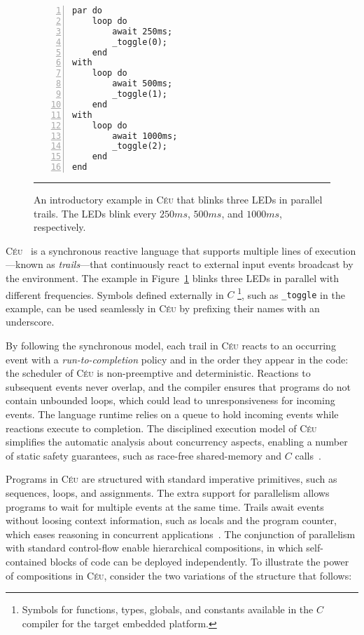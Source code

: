 \documentclass[pdftex,12pt,a4paper]{article}
\newcommand{\CEU}{\textsc{C\'{e}u}\xspace}
\newcommand{\code}[1] {{\small{\texttt{#1}}}}
\begin{document}
\begin{figure}[t]
\begin{lstlisting}[numbers=left,xleftmargin=3em]
par do
    loop do
        await 250ms;
        _toggle(0);
    end
with
    loop do
        await 500ms;
        _toggle(1);
    end
with
    loop do
        await 1000ms;
        _toggle(2);
    end
end
\end{lstlisting}
\rule{8.6cm}{0.37pt}
\caption{
    An introductory example in \CEU that blinks three LEDs in parallel trails.
    The LEDs blink every $250ms$, $500ms$, and $1000ms$, respectively.
    \label{lst.blink}
}
\end{figure}

\CEU~\cite{ceu.sensys13,ceu.phd,ceu.rem13,ceu.tr} is a synchronous reactive 
language that supports multiple lines of execution---known as 
\emph{trails}---that continuously react to external input events broadcast by 
the environment.
%
The example in Figure~\ref{lst.blink} blinks three LEDs in parallel with 
different frequencies.
%
Symbols defined externally in $C$%
\footnote{Symbols for functions, types, globals, and constants available in the 
$C$ compiler for the target embedded platform.
}, such as \code{\_toggle} in the example, can be used seamlessly in \CEU by 
prefixing their names with an underscore.

By following the synchronous model, each trail in \CEU reacts to an occurring 
event with a \emph{run-to-completion} policy and in the order they appear in 
the code: the scheduler of \CEU is non-preemptive and deterministic.
%
Reactions to subsequent events never overlap, and the compiler ensures that 
programs do not contain unbounded loops, which could lead to unresponsiveness 
for incoming events.
%
The language runtime relies on a queue to hold incoming events while reactions 
execute to completion.
%
The disciplined execution model of \CEU simplifies the automatic analysis about 
concurrency aspects, enabling a number of static safety guarantees, such as 
race-free shared-memory and $C$ calls~\cite{ceu.sensys13}.
%

Programs in \CEU are structured with standard imperative primitives, such as 
sequences, loops, and assignments.
The extra support for parallelism allows programs to wait for multiple events 
at the same time.
Trails await events without loosing context information, such as locals and the 
program counter, which eases reasoning in concurrent 
applications~\cite{sync_async.cooperative}.
%
The conjunction of parallelism with standard control-flow enable hierarchical 
compositions, in which self-contained blocks of code can be deployed 
independently.
%
To illustrate the power of compositions in \CEU, consider the two variations of 
the structure that follows:
\end{document}

